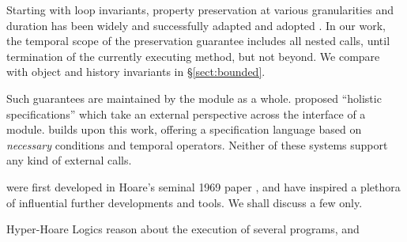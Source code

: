  
 Starting with loop invariants\cite{Hoare69,Floyd67}, property preservation at various granularities and duration has been widely and successfully adapted and adopted \cite{Hoare74,liskov94behavioral,usinghistory,Cohen10,Meyer92,MeyerDBC92,BarDelFahLeiSch04,objInvars,MuellerPoetzsch-HeffterLeavens06,DrossoFrancaMuellerSummers08}.
In our work, the temporal scope of the preservation guarantee includes all nested calls, until termination of the currently executing method, but not beyond. 
We compare with object and history invariants in \S \ref{sect:bounded}.

Such guarantees are maintained by the module as a whole.
\citet{FASE}  proposed ``holistic specifications'' which take an external
perspective across the interface of a module. %
\citet{OOPSLA22} builds upon this work, offering a specification
language based on \emph{necessary} conditions and temporal operators.
Neither of these systems support any kind of external calls.


 were first developed in Hoare's seminal 1969 paper \cite{Hoare69}, and have inspired a plethora of influential further developments and tools. We shall discuss a few only.

%
Hyper-Hoare Logics \cite{hyper-hoare-pldi2024,compositional-hypersafety-oopsla2022}  reason about the execution of several programs, and  

